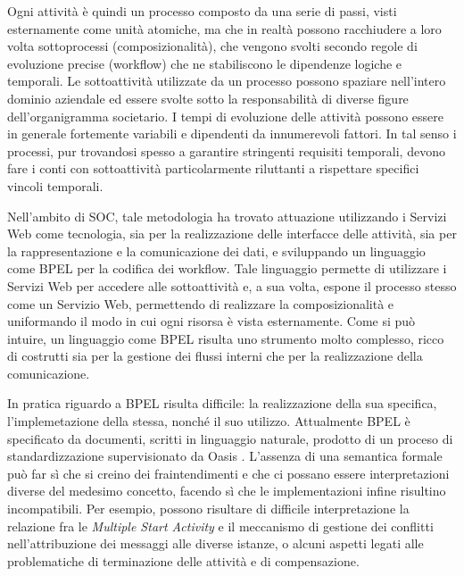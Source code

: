 Ogni attività è quindi un processo composto da una serie di passi, visti
esternamente come unità atomiche, ma che in realtà possono racchiudere a loro
volta sottoprocessi (composizionalità), che vengono svolti secondo regole di
evoluzione precise (workflow) che ne stabiliscono le dipendenze logiche e
temporali. Le sottoattività utilizzate da un processo possono spaziare
nell'intero dominio aziendale ed essere svolte sotto la responsabilità di diverse
figure dell'organigramma societario. I tempi di evoluzione delle attività possono
essere in generale fortemente variabili e dipendenti da innumerevoli fattori. In
tal senso i processi, pur trovandosi spesso a garantire stringenti requisiti
temporali, devono fare i conti con sottoattività particolarmente riluttanti a
rispettare specifici vincoli temporali.

Nell'ambito di SOC, tale metodologia ha trovato attuazione utilizzando i Servizi
Web come tecnologia, sia per la realizzazione delle interfacce delle
attività, sia per la rappresentazione e la comunicazione dei dati, e
sviluppando un linguaggio come BPEL \cite{BPEL11Spec} per la codifica dei workflow.
Tale linguaggio permette di utilizzare i Servizi Web per accedere alle
sottoattività e, a sua volta, espone il processo stesso come un Servizio Web,
permettendo di realizzare la composizionalità e uniformando il modo in cui ogni
risorsa è vista esternamente. Come si può intuire, un linguaggio come
BPEL risulta uno strumento molto complesso, ricco di costrutti sia per la gestione
dei flussi interni che per la realizzazione della comunicazione.

In pratica riguardo a BPEL risulta difficile: la realizzazione della sua
specifica, l'implemetazione della stessa, nonché il suo utilizzo. Attualmente
BPEL è specificato da documenti, scritti in linguaggio naturale, prodotto di un proceso
di standardizzazione supervisionato da Oasis \cite{OASISSite}. L'assenza di una
semantica formale può far sì che si creino dei fraintendimenti e che ci possano
essere interpretazioni diverse del medesimo concetto, facendo sì che le
implementazioni infine risultino incompatibili. Per esempio, possono risultare
di difficile interpretazione la relazione fra le \emph{Multiple Start Activity} e
il meccanismo di gestione dei conflitti nell'attribuzione dei messaggi alle
diverse istanze, o alcuni aspetti legati alle problematiche di terminazione
delle attività e di compensazione.


